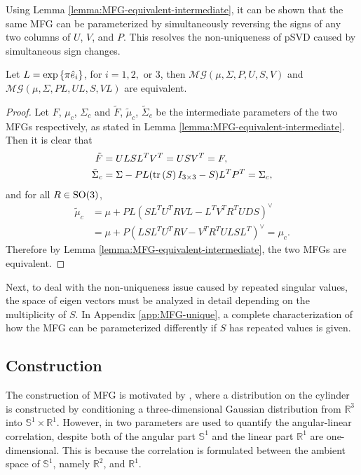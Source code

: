 Using Lemma \ref{lemma:MFG-equivalent-intermediate}, it can be shown that the same MFG can be parameterized by simultaneously reversing the signs of any two columns of $U$, $V$, and $P$.
This resolves the non-uniqueness of pSVD caused by simultaneous sign changes.
\begin{theorem}
	Let $L = \exp\left\{ \pi\hat{e}_i \right\}$, for $i=1,2,\text{ or }3$, then $\mathcal{MG}(\mu,\allowbreak \Sigma,\allowbreak P,\allowbreak U,\allowbreak S,\allowbreak V)$ and $\mathcal{MG}(\mu,\allowbreak \Sigma,\allowbreak PL,\allowbreak UL,\allowbreak S,\allowbreak VL)$ are equivalent.
\end{theorem}
\begin{proof}
	Let $F$, $\mu_c$, $\Sigma_c$ and $\tilde{F}$, $\tilde{\mu}_c$, $\tilde{\Sigma}_c$ be the intermediate parameters of the two MFGs respectively, as stated in Lemma \ref{lemma:MFG-equivalent-intermediate}.
	Then it is clear that
	\begin{align*}
		\tilde{F} &= ULSL^TV^T = USV^T = F, \\
		\tilde{\Sigma}_c &= \Sigma-PL(\mathrm{tr}\left( S \right)I_{3\times 3}-S)L^TP^T = \Sigma_c,
	\end{align*}
	and for all $R\in\mathrm{SO}(3)$,
	\begin{align*}
		\tilde{\mu}_c &= \mu + PL(SL^TU^TRVL - L^TV^TR^TUDS)^\vee \\
		&= \mu + P(LSL^TU^TRV - V^TR^TULSL^T)^\vee = \mu_c.
	\end{align*}
	Therefore by Lemma \ref{lemma:MFG-equivalent-intermediate}, the two MFGs are equivalent.
\end{proof}

Next, to deal with the non-uniqueness issue caused by repeated singular values, the space of eigen vectors must be analyzed in detail depending on the multiplicity of $S$.
In Appendix \ref{app:MFG-unique}, a complete characterization of how the MFG can be parameterized differently if $S$ has repeated values is given.

\subsection{Construction}

The construction of MFG is motivated by \cite{mardia1978model}, where a distribution on the cylinder is constructed by conditioning a three-dimensional Gaussian distribution from $\mathbb{R}^3$ into $\mathbb{S}^1 \times \mathbb{R}^1$.
However, in \cite{mardia1978model} two parameters are used to quantify the angular-linear correlation, despite both of the angular part $\mathbb{S}^1$ and the linear part $\mathbb{R}^1$ are one-dimensional.
This is because the correlation is formulated between the ambient space of $\mathbb{S}^1$, namely $\mathbb{R}^2$, and $\mathbb{R}^1$.

